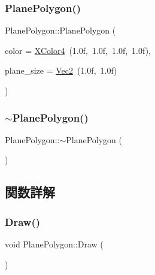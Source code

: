 \subsubsection{\texorpdfstring{Plane\+Polygon()}{PlanePolygon()}}
{\footnotesize\ttfamily Plane\+Polygon\+::\+Plane\+Polygon (\begin{DoxyParamCaption}\item[{\mbox{\hyperlink{_vector3_d_8h_a680c30c4a07d86fe763c7e01169cd6cc}{X\+Color4}}}]{color = {\ttfamily \mbox{\hyperlink{_vector3_d_8h_a680c30c4a07d86fe763c7e01169cd6cc}{X\+Color4}}~(1.0f,~1.0f,~1.0f,~1.0f)},  }\item[{\mbox{\hyperlink{_vector3_d_8h_a5ef6e95dfc5f9d3820b71772d99bbc25}{Vec2}}}]{plane\+\_\+size = {\ttfamily \mbox{\hyperlink{_vector3_d_8h_a5ef6e95dfc5f9d3820b71772d99bbc25}{Vec2}}~(1.0f,~1.0f)} }\end{DoxyParamCaption})}

\mbox{\label{class_plane_polygon_ac91d7ac1ceb00239f54b543690a78dab}} 
\subsubsection{\texorpdfstring{$\sim$\+Plane\+Polygon()}{~PlanePolygon()}}
{\footnotesize\ttfamily Plane\+Polygon\+::$\sim$\+Plane\+Polygon (\begin{DoxyParamCaption}{ }\end{DoxyParamCaption})\hspace{0.3cm}{\ttfamily [virtual]}}



\subsection{関数詳解}
\mbox{\label{class_plane_polygon_a2f20691ee0feee4fa428f5d017d7062a}} 
\subsubsection{\texorpdfstring{Draw()}{Draw()}}
{\footnotesize\ttfamily void Plane\+Polygon\+::\+Draw (\begin{DoxyParamCaption}{ }\end{DoxyParamCaption})}

